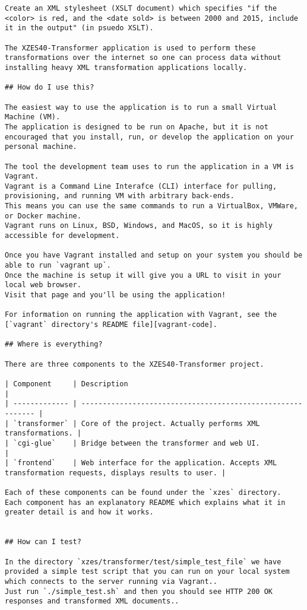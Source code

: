 \begin{lstlisting}
Create an XML stylesheet (XSLT document) which specifies "if the <color> is red, and the <date sold> is between 2000 and 2015, include it in the output" (in psuedo XSLT).

The XZES40-Transformer application is used to perform these transformations over the internet so one can process data without installing heavy XML transformation applications locally.

## How do I use this?

The easiest way to use the application is to run a small Virtual Machine (VM).
The application is designed to be run on Apache, but it is not encouraged that you install, run, or develop the application on your personal machine.

The tool the development team uses to run the application in a VM is Vagrant.
Vagrant is a Command Line Interafce (CLI) interface for pulling, provisioning, and running VM with arbitrary back-ends.
This means you can use the same commands to run a VirtualBox, VMWare, or Docker machine.
Vagrant runs on Linux, BSD, Windows, and MacOS, so it is highly accessible for development.

Once you have Vagrant installed and setup on your system you should be able to run `vagrant up`.
Once the machine is setup it will give you a URL to visit in your local web browser.
Visit that page and you'll be using the application!

For information on running the application with Vagrant, see the [`vagrant` directory's README file][vagrant-code].

## Where is everything?

There are three components to the XZES40-Transformer project.

| Component     | Description                                                 |
| ------------- | ----------------------------------------------------------- |
| `transformer` | Core of the project. Actually performs XML transformations. |
| `cgi-glue`    | Bridge between the transformer and web UI.                  |
| `frontend`    | Web interface for the application. Accepts XML transformation requests, displays results to user. |

Each of these components can be found under the `xzes` directory.
Each component has an explanatory README which explains what it in greater detail is and how it works.


## How can I test?

In the directory `xzes/transformer/test/simple_test_file` we have provided a simple test script that you can run on your local system which connects to the server running via Vagrant..
Just run `./simple_test.sh` and then you should see HTTP 200 OK responses and transformed XML documents..


\end{lstlisting}
